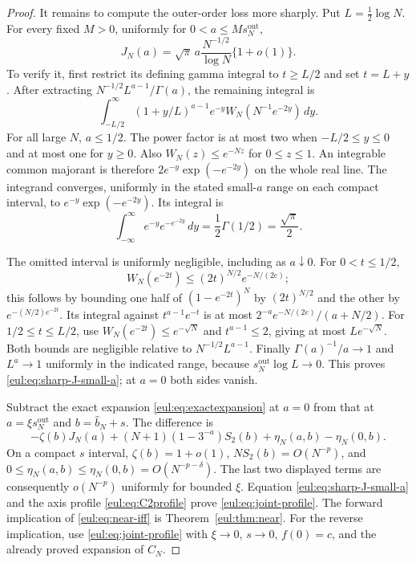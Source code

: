 \documentclass[11pt]{article}
\numberwithin{equation}{section}
\theoremstyle{definition}
\theoremstyle{remark}
\begin{document}
\begin{proof}
It remains to compute the outer-order loss more sharply. Put
$L=\tfrac12\log N$. For every fixed $M>0$, uniformly for
$0<a\leq M s_N^{\mathrm{out}}$,
\begin{equation}\label{eul:eq:sharp-J-small-a}
 J_N(a)=\sqrt\pi\,a\frac{N^{-1/2}}{\log N}\{1+o(1)\}.
\end{equation}
To verify it, first restrict its defining gamma integral to $t\geq L/2$
and set $t=L+y$. After extracting $N^{-1/2}L^{a-1}/\Gamma(a)$,
the remaining integral is
\[
 \int_{-L/2}^{\infty}(1+y/L)^{a-1}e^{-y}
       W_N(N^{-1}e^{-2y})\,dy.
\]
For all large $N$, $a\leq1/2$. The power factor is at most two
when $-L/2\leq y\leq0$ and at most one for $y\geq0$.
Also $W_N(z)\leq e^{-Nz}$ for $0\leq z\leq1$.
An integrable common majorant is therefore
$2e^{-y}\exp(-e^{-2y})$ on the whole real line.
The integrand converges, uniformly in the stated small-$a$ range
on each compact interval, to $e^{-y}\exp(-e^{-2y})$.
Its integral is
\[
 \int_{-\infty}^{\infty}e^{-y}e^{-e^{-2y}}\,dy
       =\frac12\Gamma(1/2)=\frac{\sqrt\pi}{2}.
\]

The omitted interval is uniformly negligible, including as $a\downarrow0$.
For $0<t\leq1/2$,
\[
 W_N(e^{-2t})\leq(2t)^{N/2}e^{-N/(2e)};
\]
this follows by bounding one half of $(1-e^{-2t})^N$ by $(2t)^{N/2}$
and the other by $e^{-(N/2)e^{-2t}}$.
Its integral against $t^{a-1}e^{-t}$ is at most
$2^{-a}e^{-N/(2e)}/(a+N/2)$.
For $1/2\leq t\leq L/2$, use
$W_N(e^{-2t})\leq e^{-\sqrt N}$ and $t^{a-1}\leq2$,
giving at most $L e^{-\sqrt N}$.
Both bounds are negligible relative to $N^{-1/2}L^{a-1}$.
Finally $\Gamma(a)^{-1}/a\to1$ and
$L^a\to1$ uniformly in the indicated range, because
$s_N^{\mathrm{out}}\log L\to0$. This proves
\eqref{eul:eq:sharp-J-small-a}; at $a=0$ both sides vanish.

Subtract the exact expansion \eqref{eul:eq:exactexpansion} at $a=0$
from that at $a=\xi s_N^{\mathrm{out}}$ and
$b=\widehat b_N+s$. The difference is
\[
 -\zeta(b)J_N(a)
 +(N+1)(1-3^{-a})S_2(b)+\eta_N(a,b)-\eta_N(0,b).
\]
On a compact $s$ interval, $\zeta(b)=1+o(1)$,
$NS_2(b)=O(N^{-p})$, and
$0\leq\eta_N(a,b)\leq\eta_N(0,b)=O(N^{-p-\delta})$.
The last two displayed terms are consequently $o(N^{-p})$
uniformly for bounded $\xi$. Equation \eqref{eul:eq:sharp-J-small-a}
and the axis profile \eqref{eul:eq:C2profile} prove
\eqref{eul:eq:joint-profile}.
The forward implication of \eqref{eul:eq:near-iff} is
Theorem~\ref{eul:thm:near}. For the reverse implication, use
\eqref{eul:eq:joint-profile} with $\xi\to0$, $s\to0$,
$f(0)=c$, and the already proved expansion of $C_N$.
\end{proof}
\end{document}

